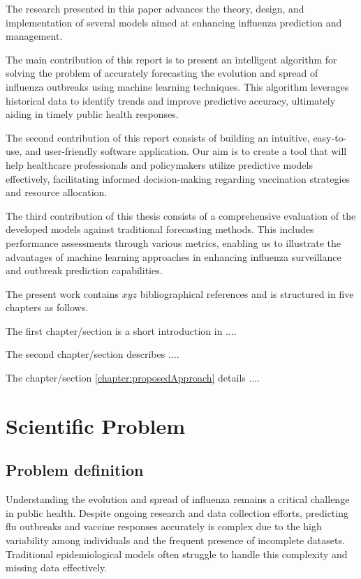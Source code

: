 \documentclass[runningheads,a4paper,11pt]{report}
\begin{document}
    The research presented in this paper advances the theory, design, and implementation of several models aimed at enhancing influenza prediction and management.

The main contribution of this report is to present an intelligent algorithm for solving the problem of accurately forecasting the evolution and spread of influenza outbreaks using machine learning techniques. This algorithm leverages historical data to identify trends and improve predictive accuracy, ultimately aiding in timely public health responses.

The second contribution of this report consists of building an intuitive, easy-to-use, and user-friendly software application. Our aim is to create a tool that will help healthcare professionals and policymakers utilize predictive models effectively, facilitating informed decision-making regarding vaccination strategies and resource allocation.

The third contribution of this thesis consists of a comprehensive evaluation of the developed models against traditional forecasting methods. This includes performance assessments through various metrics, enabling us to illustrate the advantages of machine learning approaches in enhancing influenza surveillance and outbreak prediction capabilities.


The present work contains $xyz$ bibliographical references and is structured in five chapters as follows.

The first chapter/section is a short introduction in $\ldots$.

The second chapter/section describes $\ldots$.

The chapter/section \ref{chapter:proposedApproach} details $\ldots$.



\chapter{Scientific Problem}
\label{section:scientificProblem}


\section{Problem definition}
\label{section:problemDefinition}

Understanding the evolution and spread of influenza remains a critical challenge in public health. Despite ongoing research and data collection efforts, predicting flu outbreaks and vaccine responses accurately is complex due to the high variability among individuals and the frequent presence of incomplete datasets. Traditional epidemiological models often struggle to handle this complexity and missing data effectively.
\end{document}
